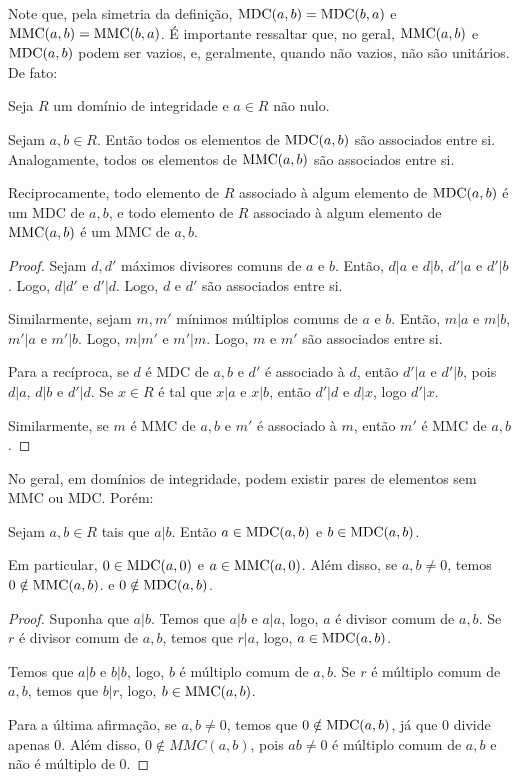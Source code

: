 Note que, pela simetria da definição, $\operatorname{MDC}(a, b)=\operatorname{MDC}(b, a)$ e $\operatorname{MMC}(a, b)=\operatorname{MMC}(b, a)$.
É importante ressaltar que, no geral, $\operatorname{MMC}(a, b)$ e $\operatorname{MDC}(a, b)$ podem ser vazios, e, geralmente, quando não vazios, não são unitários.
De fato:
\begin{lemma}
    Seja $R$ um domínio de integridade e $a \in R$ não nulo.

    Sejam $a, b \in R$.
    Então todos os elementos de $\operatorname{MDC}(a, b)$ são associados entre si.
    Analogamente, todos os elementos de $\operatorname{MMC}(a, b)$ são associados entre si.

    Reciprocamente, todo elemento de $R$ associado à algum elemento de $\operatorname{MDC}(a, b)$ é um MDC de $a, b$, e todo elemento de $R$ associado à algum elemento de $\operatorname{MMC}(a, b)$ é um MMC de $a, b$.
\end{lemma}
\begin{proof}
Sejam $d, d'$ máximos divisores comuns de $a$ e $b$.
Então, $d|a$ e $d|b$, $d'|a$ e $d'|b$.
Logo, $d|d'$ e $d'|d$.
Logo, $d$ e $d'$ são associados entre si.

Similarmente, sejam $m, m'$ mínimos múltiplos comuns de $a$ e $b$.
Então, $m|a$ e $m|b$, $m'|a$ e $m'|b$.
Logo, $m|m'$ e $m'|m$.
Logo, $m$ e $m'$ são associados entre si.

Para a recíproca, se $d$ é MDC de $a, b$ e $d'$ é associado à $d$, então $d'|a$ e $d'|b$, pois $d|a$, $d|b$ e $d'|d$.
Se $x\in R$ é tal que $x|a$ e $x|b$, então $d'|d$ e $d|x$, logo $d'|x$.

Similarmente, se $m$ é MMC de $a, b$ e $m'$ é associado à $m$, então $m'$ é MMC de $a, b$.
\end{proof}
No geral, em domínios de integridade, podem existir pares de elementos sem MMC ou MDC.
Porém:

\begin{lemma}
Sejam $a, b \in R$ tais que $a|b$.
Então $a \in \operatorname{MDC}(a, b)$ e $b \in \operatorname{MDC}(a, b)$.

Em particular, $0 \in \operatorname{MDC}(a, 0)$ e $a \in \operatorname{MMC}(a, 0)$.
Além disso, se $a, b \neq 0$, temos $0 \notin \operatorname{MMC}(a, b)$. e $0 \notin \operatorname{MDC}(a, b)$.
\end{lemma}

\begin{proof}
    Suponha que $a|b$.
    Temos que $a|b$ e $a|a$, logo, $a$ é divisor comum de $a, b$.
    Se $r$ é divisor comum de $a, b$, temos que $r|a$, logo, $a \in \operatorname{MDC}(a, b)$.

    Temos que $a|b$ e $b|b$, logo, $b$ é múltiplo comum de $a, b$.
    Se $r$ é múltiplo comum de $a, b$, temos que $b|r$, logo, $b \in \operatorname{MMC}(a, b)$.

    Para a última afirmação, se $a, b \neq 0$, temos que $0 \notin \operatorname{MDC}(a, b)$, já que $0$ divide apenas $0$.
    Além disso, $0 \notin MMC(a, b)$, pois $ab\neq 0$ é múltiplo comum de $a, b$ e não é múltiplo de $0$.
\end{proof}



